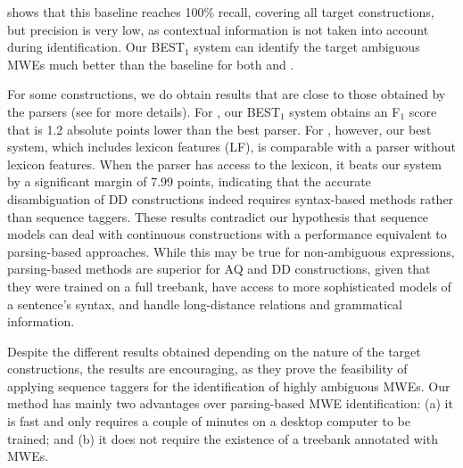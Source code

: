 \documentclass[output=paper,
modfonts
]{langscibook}
\begin{document}
 shows that this baseline reaches 100\% recall, covering all target constructions, but precision is very low, as contextual information is not taken into account during identification.
Our \textsc{BEST$_1$} system can identify the target ambiguous MWEs much better than the baseline for both \fullAQ{} and \fullDD{}.

For some constructions, we do obtain results that are close to those obtained by the parsers (see  for more details). For \fullAQ{}, our \textsc{BEST$_1$} system obtains an F$_1$ score that is 1.2 absolute points lower than the best parser. For \fullDD{}, however, our best system, which includes lexicon features (LF), is comparable with a parser without lexicon features. When the parser has access to the lexicon, it beats our system by a significant margin of 7.99 points, indicating that the accurate disambiguation of DD constructions indeed requires syntax-based methods rather than sequence taggers. These results contradict our hypothesis that sequence models can deal with continuous constructions with a performance equivalent to parsing-based approaches. While this may be true for non-ambiguous expressions, parsing-based methods are superior for AQ and DD constructions, given that they were trained on a full treebank, have access to more sophisticated models of a sentence's syntax, and handle long-distance relations and grammatical information.

Despite the different results obtained depending on the nature of the target constructions, the results are encouraging, as they prove the feasibility of applying sequence taggers for the identification of highly ambiguous MWEs. Our method has mainly two advantages over parsing-based MWE identification: (a) it is fast and only requires a couple of minutes on a desktop computer to be trained; and (b) it does not require the existence of a treebank annotated with MWEs.
\end{document}
